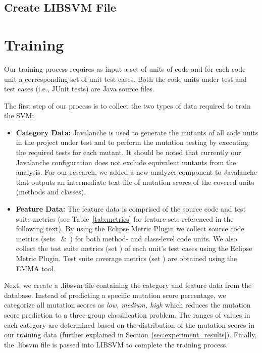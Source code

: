 \subsection{Create LIBSVM File}
\label{subsec:appraoch_create_libsvm_file}


\section{Training}
\label{sec:approach_training}
Our training process requires as input a set of units of code and for each code unit a corresponding set of unit test cases. Both the code units under test and test cases (i.e., JUnit tests) are Java source files.

The first step of our process is to collect the two types of data required to train the SVM:

\begin{itemize}
  \item \textbf{Category Data:} Javalanche is used to generate the mutants of all code units in the project under test and to perform the mutation testing by executing the required tests for each mutant. It should be noted that currently our Javalanche configuration does not exclude equivalent mutants from the analysis. For our research, we added a new analyzer component to Javalanche that outputs an intermediate text file of mutation scores of the covered units (methods and classes).

  \item \textbf{Feature Data:} The feature data is comprised of the source code and test suite metrics (see Table~\ref{tab:metrics} for feature sets referenced in the following text). By using the Eclipse Metric Plugin we collect source code metrics (sets ~\&~) for both method- and class-level code units. We also collect the test suite metrics (set ) of each unit's test cases using the Eclipse Metric Plugin. Test suite coverage metrics (set ) are obtained using the EMMA tool.
\end{itemize}

Next, we create a .libsvm file containing the category and feature data from the database. Instead of predicting a specific mutation score percentage, we categorize all mutation scores as \textit{low, medium, high} which reduces the mutation score prediction to a three-group classification problem. The ranges of values in each category are determined based on the distribution of the mutation scores in our training data (further explained in Section~\ref{sec:experiment_results}). Finally, the .libsvm file is passed into LIBSVM to complete the training process.


